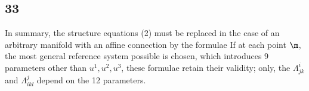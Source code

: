 \subsection*{33}

In summary, the structure equations (2) must be replaced in the case of an arbitrary manifold with an affine connection by the formulae
If at each point $\m$, the most general reference system possible is chosen, which introduces 9 parameters other than $u^1, u^2, u^3$, these formulae retain their validity; only, the $\Lambda_{jk}^i$ and $\Lambda_{ikl}^j$ depend on the 12 parameters.

